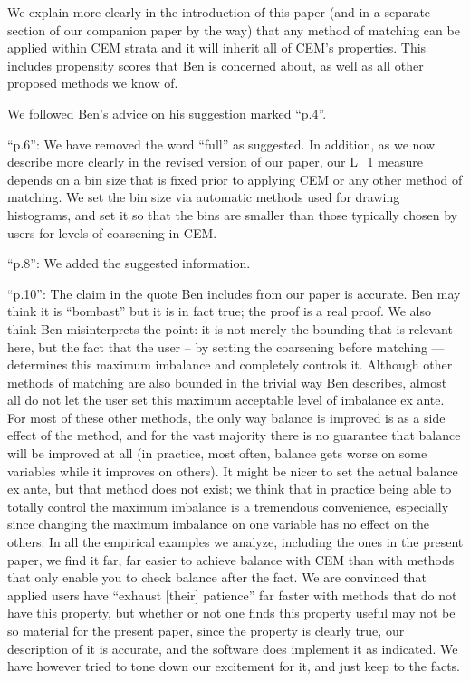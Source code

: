 We explain more clearly in the introduction of this paper (and in a
separate section of our companion paper by the way) that any method of
matching can be applied within CEM strata and it will inherit all of
CEM's properties.  This includes propensity scores that Ben is
concerned about, as well as all other proposed methods we know of.

We followed Ben's advice on his suggestion marked ``p.4''.

``p.6'': We have removed the word ``full'' as suggested.  In addition,
as we now describe more clearly in the revised version of our paper,
our L_1 measure depends on a bin size that is fixed prior to applying
CEM or any other method of matching.  We set the bin size via
automatic methods used for drawing histograms, and set it so that the
bins are smaller than those typically chosen by users for levels of
coarsening in CEM.

``p.8'': We added the suggested information.

``p.10'': The claim in the quote Ben includes from our paper is
accurate.  Ben may think it is ``bombast'' but it is in fact true; the
proof is a real proof.  We also think Ben misinterprets the point: it
is not merely the bounding that is relevant here, but the fact that
the user -- by setting the coarsening before matching --- determines
this maximum imbalance and completely controls it.  Although other
methods of matching are also bounded in the trivial way Ben describes,
almost all do not let the user set this maximum acceptable level of
imbalance ex ante.  For most of these other methods, the only way
balance is improved is as a side effect of the method, and for the
vast majority there is no guarantee that balance will be improved at
all (in practice, most often, balance gets worse on some variables
while it improves on others).  It might be nicer to set the actual
balance ex ante, but that method does not exist; we think that in
practice being able to totally control the maximum imbalance is a
tremendous convenience, especially since changing the maximum
imbalance on one variable has no effect on the others.  In all the
empirical examples we analyze, including the ones in the present
paper, we find it far, far easier to achieve balance with CEM than
with methods that only enable you to check balance after the fact.  We
are convinced that applied users have ``exhaust [their] patience'' far
faster with methods that do not have this property, but whether or not
one finds this property useful may not be so material for the present
paper, since the property is clearly true, our description of it is
accurate, and the software does implement it as indicated.  We have
however tried to tone down our excitement for it, and just keep to the
facts.



